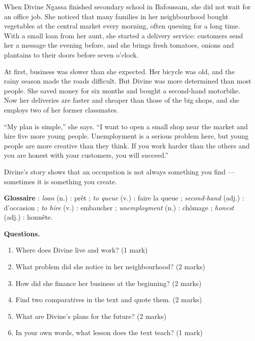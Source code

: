 \documentclass[11pt]{article}
\begin{document}
\begin{textebox}
When Divine Ngassa finished secondary school in Bafoussam, she did not wait for an office job. She noticed that many families in her neighbourhood bought vegetables at the central market every morning, often queuing for a long time. With a small loan from her aunt, she started a delivery service: customers send her a message the evening before, and she brings fresh tomatoes, onions and plantains to their doors before seven o'clock.

At first, business was slower than she expected. Her bicycle was old, and the rainy season made the roads difficult. But Divine was more determined than most people. She saved money for six months and bought a second-hand motorbike. Now her deliveries are faster and cheaper than those of the big shops, and she employs two of her former classmates.

“My plan is simple,” she says. “I want to open a small shop near the market and hire five more young people. Unemployment is a serious problem here, but young people are more creative than they think. If you work harder than the others and you are honest with your customers, you will succeed.”

Divine's story shows that an occupation is not always something you find — sometimes it is something you create.
\end{textebox}

\textbf{Glossaire} : \emph{loan} (n.) : prêt ; \emph{to queue} (v.) : faire la queue ; \emph{second-hand} (adj.) : d'occasion ; \emph{to hire} (v.) : embaucher ; \emph{unemployment} (n.) : chômage ; \emph{honest} (adj.) : honnête.

\textbf{Questions.}
\begin{enumerate}
\item Where does Divine live and work? (1 mark)
\item What problem did she notice in her neighbourhood? (2 marks)
\item How did she finance her business at the beginning? (2 marks)
\item Find two comparatives in the text and quote them. (2 marks)
\item What are Divine's plans for the future? (2 marks)
\item In your own words, what lesson does the text teach? (1 mark)
\end{enumerate}
\end{document}
